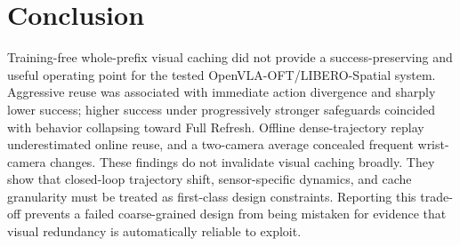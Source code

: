 \documentclass[11pt]{article}
\begin{document}
\section{Conclusion}

Training-free whole-prefix visual caching did not provide a success-preserving and useful operating point for the tested OpenVLA-OFT/LIBERO-Spatial system. Aggressive reuse was associated with immediate action divergence and sharply lower success; higher success under progressively stronger safeguards coincided with behavior collapsing toward Full Refresh. Offline dense-trajectory replay underestimated online reuse, and a two-camera average concealed frequent wrist-camera changes. These findings do not invalidate visual caching broadly. They show that closed-loop trajectory shift, sensor-specific dynamics, and cache granularity must be treated as first-class design constraints. Reporting this trade-off prevents a failed coarse-grained design from being mistaken for evidence that visual redundancy is automatically reliable to exploit.
\end{document}
